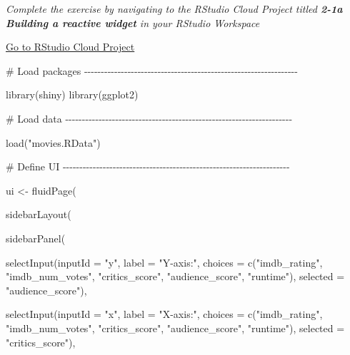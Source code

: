 \documentclass[
  letterpaper,
  DIV=11,
  numbers=noendperiod]{scrreprt}
\newenvironment{Shaded}{\begin{snugshade}}{\end{snugshade}}
\newcommand{\AttributeTok}[1]{\textcolor[rgb]{0.40,0.46,0.14}{#1}}
\newcommand{\CommentTok}[1]{\textcolor[rgb]{0.37,0.37,0.37}{#1}}
\newcommand{\FunctionTok}[1]{\textcolor[rgb]{0.28,0.35,0.67}{#1}}
\newcommand{\NormalTok}[1]{\textcolor[rgb]{0.00,0.46,0.62}{#1}}
\newcommand{\OtherTok}[1]{\textcolor[rgb]{0.00,0.46,0.62}{#1}}
\newcommand{\StringTok}[1]{\textcolor[rgb]{0.13,0.47,0.30}{#1}}
\begin{document}
\emph{Complete the exercise by navigating to the RStudio Cloud Project
titled \textbf{2-1a Building a reactive widget} in your RStudio
Workspace}

\href{https://rstudio.cloud/spaces/81721/join?access_code=I4VJaNsKfTqR3Td9hLP7E1nz8\%2FtMg6Xbw9Bgqumv}{
Go to RStudio Cloud Project}

\begin{Shaded}
\begin{Highlighting}[]
\CommentTok{\# Load packages {-}{-}{-}{-}{-}{-}{-}{-}{-}{-}{-}{-}{-}{-}{-}{-}{-}{-}{-}{-}{-}{-}{-}{-}{-}{-}{-}{-}{-}{-}{-}{-}{-}{-}{-}{-}{-}{-}{-}{-}{-}{-}{-}{-}{-}{-}{-}{-}{-}{-}{-}{-}{-}{-}{-}{-}{-}{-}{-}{-}{-}{-}{-}{-}}

\FunctionTok{library}\NormalTok{(shiny)}
\FunctionTok{library}\NormalTok{(ggplot2)}

\CommentTok{\# Load data {-}{-}{-}{-}{-}{-}{-}{-}{-}{-}{-}{-}{-}{-}{-}{-}{-}{-}{-}{-}{-}{-}{-}{-}{-}{-}{-}{-}{-}{-}{-}{-}{-}{-}{-}{-}{-}{-}{-}{-}{-}{-}{-}{-}{-}{-}{-}{-}{-}{-}{-}{-}{-}{-}{-}{-}{-}{-}{-}{-}{-}{-}{-}{-}{-}{-}{-}{-}}

\FunctionTok{load}\NormalTok{(}\StringTok{"movies.RData"}\NormalTok{)}

\CommentTok{\# Define UI {-}{-}{-}{-}{-}{-}{-}{-}{-}{-}{-}{-}{-}{-}{-}{-}{-}{-}{-}{-}{-}{-}{-}{-}{-}{-}{-}{-}{-}{-}{-}{-}{-}{-}{-}{-}{-}{-}{-}{-}{-}{-}{-}{-}{-}{-}{-}{-}{-}{-}{-}{-}{-}{-}{-}{-}{-}{-}{-}{-}{-}{-}{-}{-}{-}{-}{-}{-}}

\NormalTok{ui }\OtherTok{\textless{}{-}} \FunctionTok{fluidPage}\NormalTok{(}
  
  \FunctionTok{sidebarLayout}\NormalTok{(}
    
    \FunctionTok{sidebarPanel}\NormalTok{(}
      
      \FunctionTok{selectInput}\NormalTok{(}\AttributeTok{inputId =} \StringTok{"y"}\NormalTok{, }
                  \AttributeTok{label =} \StringTok{"Y{-}axis:"}\NormalTok{,}
                  \AttributeTok{choices =} \FunctionTok{c}\NormalTok{(}\StringTok{"imdb\_rating"}\NormalTok{, }\StringTok{"imdb\_num\_votes"}\NormalTok{, }\StringTok{"critics\_score"}\NormalTok{, }\StringTok{"audience\_score"}\NormalTok{, }\StringTok{"runtime"}\NormalTok{), }
                  \AttributeTok{selected =} \StringTok{"audience\_score"}\NormalTok{),}
      
      \FunctionTok{selectInput}\NormalTok{(}\AttributeTok{inputId =} \StringTok{"x"}\NormalTok{, }
                  \AttributeTok{label =} \StringTok{"X{-}axis:"}\NormalTok{,}
                  \AttributeTok{choices =} \FunctionTok{c}\NormalTok{(}\StringTok{"imdb\_rating"}\NormalTok{, }\StringTok{"imdb\_num\_votes"}\NormalTok{, }\StringTok{"critics\_score"}\NormalTok{, }\StringTok{"audience\_score"}\NormalTok{, }\StringTok{"runtime"}\NormalTok{), }
                  \AttributeTok{selected =} \StringTok{"critics\_score"}\NormalTok{),}
      

\end{Highlighting}
\end{Shaded}
\end{document}
